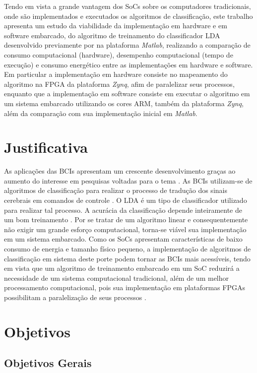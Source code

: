 Tendo em vista a grande vantagem dos SoCs sobre os computadores tradicionais, onde são implementados e executados os algoritmos de classificação, este trabalho apresenta um estudo da viabilidade da implementação em hardware e em software embarcado, do algoritmo de treinamento do classificador LDA desenvolvido previamente por \cite{F.Lotte} na plataforma \textit{Matlab}, realizando a comparação de consumo computacional (hardware), desempenho computacional (tempo de execução) e consumo energético entre as implementações em hardware e software. Em particular a implementação em hardware consiste no mapeamento do algoritmo na FPGA da plataforma \textit{Zynq}, afim de paralelizar seus processos, enquanto que a implementação em software consiste em executar o algoritmo em um sistema embarcado utilizando os cores ARM, também da plataforma \textit{Zynq}, além da comparação com sua implementação inicial em \textit{Matlab}.


\section{Justificativa}
As aplicações das BCIs apresentam um crescente desenvolvimento  graças ao aumento do interesse em pesquisas voltadas para o tema \cite{BCICompetition} . As BCIs utilizam-se de algoritmos de classificação para realizar o processo de tradução dos sinais cerebrais em comandos de controle \cite{MasonAndBirch}. O LDA é um tipo de classificador utilizado para realizar tal processo. A acurácia da classificação depende inteiramente de um bom treinamento \cite{F.Lotte}. Por se tratar de um algoritmo linear e consequentemente não exigir um grande esforço computacional, torna-se viável sua implementação em um sistema embarcado. Como os SoCs apresentam características de baixo consumo de energia e tamanho físico pequeno, a implementação de algoritmos de classificação em sistema deste porte podem tornar as BCIs mais acessíveis, tendo em vista que um algoritmo de treinamento embarcado em um SoC reduzirá a necessidade de um sistema computacional tradicional, além de um melhor processamento computacional, pois sua implementação em plataformas FPGAs possibilitam a paralelização de seus processos \cite{zynqBook}.

\section{Objetivos}

\subsection{Objetivos Gerais}


